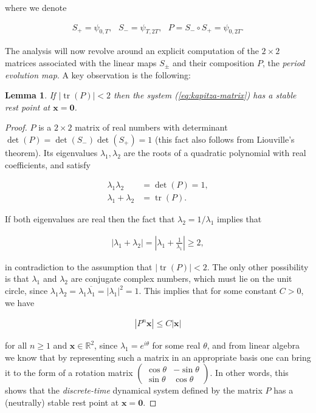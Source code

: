 \documentclass[11pt]{report}
\newcommand{\R}{\mathbb{R}}
\theoremstyle{plain}
\newtheorem{lem}[thm]{Lemma}
\theoremstyle{definition}
\begin{document}
where we denote

\begin{align*}
S_+ = \psi_{0,T}, \ \ \ S_- = \psi_{T,2T}, \ \ \ P= S_- \circ S_+ = \psi_{0,2T}.
\end{align*}

The analysis will now revolve around an explicit
computation of the $2\times 2$ matrices associated
with the linear maps $S_\pm$ and their composition
$P$, the \emph{period evolution map}. A key observation is
the following:

\begin{lem}
If $|\operatorname{tr}(P)|<2$ then the system
(\ref{eq:kapitza-matrix}) has a stable rest point at
$\mathbf{x}=\mathbf{0}$.
\end{lem}

\begin{proof}
$P$ is a $2\times 2$ matrix of real numbers with
determinant $\det(P)=\det(S_-)\det(S_+)=1$ (this fact
also follows from Liouville's theorem). Its
eigenvalues $\lambda_1, \lambda_2$ are the roots of a
quadratic polynomial with real coefficients, and
satisfy

\begin{align*}
\lambda_1 \lambda_2 &= \det(P)=1, \\
\lambda_1 + \lambda_2 &= \operatorname{tr}(P).
\end{align*}

If both eigenvalues are real then the fact that
$\lambda_2=1/\lambda_1$ implies that

\begin{align*}
|\lambda_1 + \lambda_2| = \left|\lambda_1 + \frac{1}{\lambda_1}\right| \ge 2,
\end{align*}

in contradiction to the assumption that
$|\operatorname{tr}(P)|<2$. The only other
possibility is that $\lambda_1$ and $\lambda_2$ are
conjugate complex numbers, which must lie on the unit
circle, since
$\lambda_1\lambda_2 = \lambda_1 \overline{\lambda_1}=
|\lambda_1|^2 = 1$.
This implies that for some constant $C>0$, we have

\begin{align*}
|P^n \mathbf{x}| \le C |\mathbf{x}|
\end{align*}

for all $n\ge1$ and $\mathbf{x}\in \R^2$, since
$\lambda_1=e^{i\theta}$ for some real $\theta$, and
from linear algebra we know that by representing such
a matrix in an appropriate basis one can bring it to
the form of a rotation matrix
$\left(\begin{array}{cc} \cos \theta & -\sin\theta \\
\sin\theta & \cos\theta\end{array} \right)$.
In other words, this shows that the \emph{discrete-time}
dynamical system defined by the matrix $P$ has a
(neutrally) stable rest point at
$\mathbf{x}=\mathbf{0}$.


\end{proof}
\end{document}
